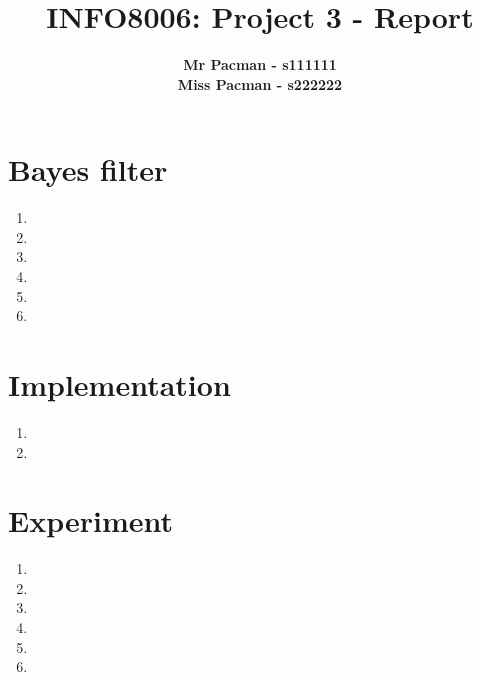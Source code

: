 \documentclass{article}
\begin{document}

\title{\Large{INFO8006: Project 3 - Report}}
\vspace{1cm}
\author{\small{\bf Mr Pacman - s111111} \\ \small{\bf Miss Pacman - s222222}}

\maketitle


\section{Bayes filter}

\begin{enumerate}[label=\alph*.]
    \item
    \item
    \item
    \item
    \item
    \item
\end{enumerate}

\section{Implementation}

\begin{enumerate}[label=\alph*.]
    \item
    \item
\end{enumerate}

\section{Experiment}

\begin{enumerate}[label=\alph*.]
    \item
    \item
    \item
    \item
    \item
    \item
\end{enumerate}

\end{document}
